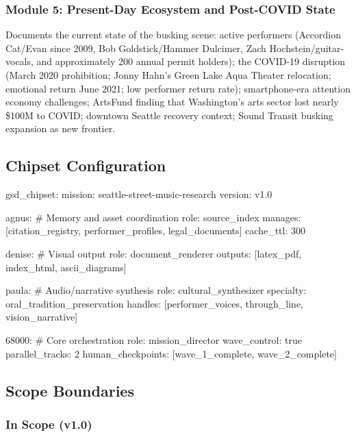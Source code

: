\documentclass[11pt,letterpaper]{article}
\begin{document}
\subsubsection{Module 5: Present-Day Ecosystem and Post-COVID State}

Documents the current state of the busking scene: active performers (Accordion Cat/Evan since 2009, Bob Goldstick/Hammer Dulcimer, Zach Hochstein/guitar-vocals, and approximately 200 annual permit holders); the COVID-19 disruption (March 2020 prohibition; Jonny Hahn's Green Lake Aqua Theater relocation; emotional return June 2021; low performer return rate); smartphone-era attention economy challenges; ArtsFund finding that Washington's arts sector lost nearly \$100M to COVID; downtown Seattle recovery context; Sound Transit busking expansion as new frontier.

\subsection{Chipset Configuration}

\begin{asciibox}
gsd_chipset:
  mission: seattle-street-music-research
  version: v1.0

  agnus:  # Memory and asset coordination
    role: source_index
    manages: [citation_registry, performer_profiles, legal_documents]
    cache_ttl: 300

  denise:  # Visual output
    role: document_renderer
    outputs: [latex_pdf, index_html, ascii_diagrams]

  paula:  # Audio/narrative synthesis
    role: cultural_synthesizer
    specialty: oral_tradition_preservation
    handles: [performer_voices, through_line, vision_narrative]

  68000:  # Core orchestration
    role: mission_director
    wave_control: true
    parallel_tracks: 2
    human_checkpoints: [wave_1_complete, wave_2_complete]
\end{asciibox}

\subsection{Scope Boundaries}

\subsubsection{In Scope (v1.0)}
\end{document}
